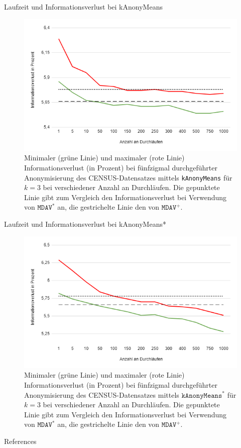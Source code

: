 \documentclass[10pt,table]{beamer}
\newcommand{\kanonymeans}{\texttt{kAnonyMeans}\xspace}
\newcommand{\kanonymeansstar}{$\texttt{kAnonyMeans}^*$\xspace}
\newcommand{\mdav}{\texttt{MDAV}\xspace}
\newcommand{\mdavplus}{$\mdav^+$\xspace}
\newcommand{\mdavstar}{$\mdav^*$\xspace}
\begin{document}
\begin{frame}[noframenumbering]{Laufzeit und Informationsverlust bei kAnonyMeans}
    \begin{figure}[H]
        \centering
        \includegraphics[scale=0.45]{Images/kanonymeansminmax.png}
        \caption{\footnotesize Minimaler (grüne Linie) und maximaler (rote Linie) Informationsverlust (in Prozent) bei fünfzigmal durchgeführter Anonymisierung des CENSUS-Datensatzes mittels \kanonymeans für $k=3$ bei verschiedener Anzahl an Durchläufen. Die gepunktete Linie gibt zum Vergleich den Informationsverlust bei Verwendung von \mdavstar an, die gestrichelte Linie den von \mdavplus.}
    \end{figure}
\end{frame}

\begin{frame}[noframenumbering]{Laufzeit und Informationsverlust bei kAnonyMeans*}
    \begin{figure}[H]
        \centering
        \includegraphics[scale=0.45]{Images/kanonymeansstarminmax.png}
        \caption{\footnotesize Minimaler (grüne Linie) und maximaler (rote Linie) Informationsverlust (in Prozent) bei fünfzigmal durchgeführter Anonymisierung des CENSUS-Datensatzes mittels \kanonymeansstar für $k=3$ bei verschiedener Anzahl an Durchläufen. Die gepunktete Linie gibt zum Vergleich den Informationsverlust bei Verwendung von \mdavstar an, die gestrichelte Linie den von \mdavplus.}
    \end{figure}
\end{frame}

\begin{frame}{References}
        
        
\end{frame}
\end{document}
